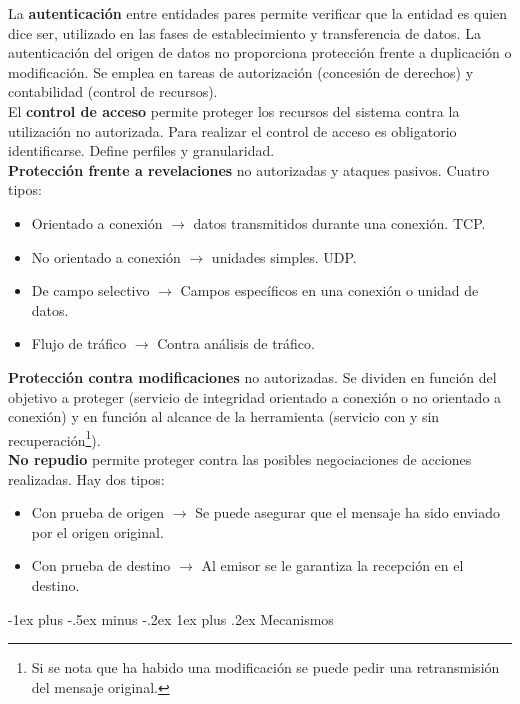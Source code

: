 \documentclass[10pt,portrait, twocolumn]{article}
\makeatletter
\renewcommand{\subsubsection}{\@startsection{subsubsection}{3}{0mm}%
                                {-1ex plus -.5ex minus -.2ex}%
                                {1ex plus .2ex}%
                                {\normalfont\small\bfseries}}
\makeatother
\begin{document}
	La \textbf{autenticación} entre entidades pares permite verificar que la entidad es quien dice ser, utilizado en las fases de establecimiento y transferencia de datos. La autenticación del origen de datos no proporciona protección frente a duplicación o modificación. Se emplea en tareas de autorización (concesión de derechos) y contabilidad (control de recursos).\\
	
	El \textbf{control de acceso} permite proteger los recursos del sistema contra la utilización no autorizada. Para realizar el control de acceso es obligatorio identificarse. Define perfiles y granularidad.\\
	
	\textbf{Protección frente a revelaciones} no autorizadas y ataques pasivos. Cuatro tipos:
	
		\begin{itemize}
			\item Orientado a conexión $\rightarrow$ datos transmitidos durante una conexión. TCP.
			\item No orientado a conexión $\rightarrow$ unidades simples. UDP.
			\item De campo selectivo $\rightarrow$ Campos específicos en una conexión o unidad de datos.
			\item Flujo de tráfico $\rightarrow$ Contra análisis de tráfico.
		\end{itemize}
		
		\textbf{Protección contra modificaciones} no autorizadas. Se dividen en función del objetivo a proteger (servicio de integridad orientado a conexión o no orientado a conexión) y en función al alcance de la herramienta (servicio con y sin recuperación\footnote{Si se nota que ha habido una modificación se puede pedir una retransmisión del mensaje original.}).\\
		
	\textbf{No repudio} permite proteger contra las posibles negociaciones de acciones realizadas. Hay dos tipos: 
	
		\begin{itemize}
			\item Con prueba de origen $\rightarrow$ Se puede asegurar que el mensaje ha sido enviado por el origen original.
			\item Con prueba de destino $\rightarrow$ Al emisor se le garantiza la recepción en el destino.
		\end{itemize}	
		
	\subsubsection{Mecanismos}
\end{document}
